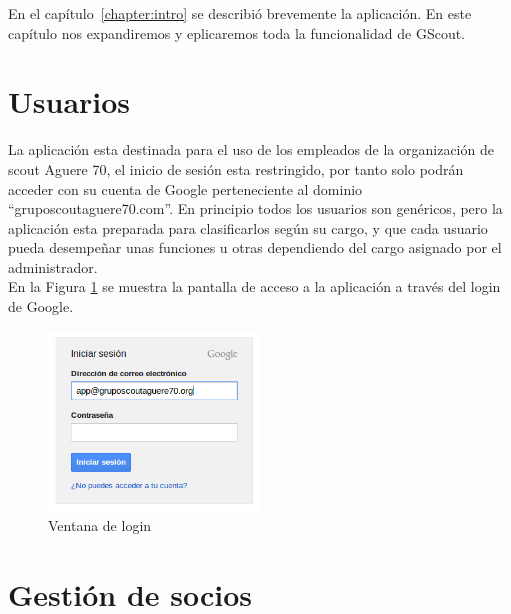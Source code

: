 
En el capítulo~\ref{chapter:intro} se describió brevemente la aplicación. En este capítulo nos expandiremos y eplicaremos toda la funcionalidad de GScout.\\

\section{Usuarios}
\label{3:sec1}

La aplicación esta destinada para el uso de los empleados de la organización de scout Aguere 70, el inicio de sesión esta restringido, por tanto solo podrán 
acceder con su cuenta de Google perteneciente al dominio ``gruposcoutaguere70.com''. En principio todos los usuarios son genéricos, pero la aplicación esta preparada
para clasificarlos según su cargo, y que cada usuario pueda desempeñar unas funciones u otras dependiendo del cargo asignado por el administrador.\\

En la Figura \ref{fig:login} se muestra la pantalla de acceso a la aplicación a través del login de Google.


\begin{figure}[H]
\begin{center}
\includegraphics[width=0.5\textwidth]{images/login.jpg}
\caption{Ventana de login}
\label{fig:login}
\end{center}
\end{figure}


\section{Gestión de socios}
\label{3:sec2}

